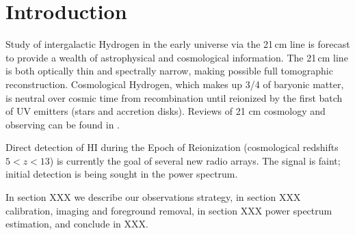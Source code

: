 \section{Introduction} 
  Study of intergalactic Hydrogen  in the early universe via the 21\,cm line is forecast to provide a wealth of astrophysical and cosmological information.  The 21\,cm line is both optically thin and spectrally narrow, making possible full tomographic reconstruction. Cosmological Hydrogen, which makes up 3/4 of baryonic matter, is neutral over cosmic time from recombination until reionized by the first batch of UV emitters (stars and accretion disks).  Reviews of 21 cm cosmology and observing can be found in \cite{Morales:2010p8093,Furlanetto:2006p2267,Pritchard:2012p9555,zaroubi2013epoch}.
  
Direct detection of HI during the Epoch of Reionization (cosmological redshifts $5<z<13$) is currently the goal of several new radio arrays.  The signal is faint; initial detection is being sought in the power spectrum.

In section XXX we describe our observations strategy, in section XXX calibration, imaging and foreground removal, in section XXX power spectrum estimation, and conclude in XXX.